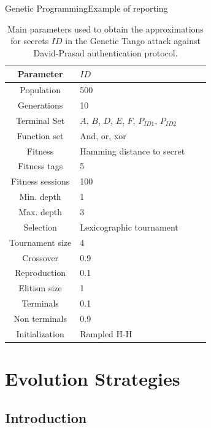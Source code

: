 \documentclass[10pt,compress]{beamer} %
\begin{document}
\begin{frame}[plain]{Genetic Programming}{Example of reporting} 
\scriptsize{
\begin{table}
	\centering
	\caption{Main parameters used to obtain the approximations for secrets $ID$ in the Genetic Tango attack against David-Prasad authentication protocol.  \label{tab:settings}}
	\begin{tabular}{clll} \hline 
	Parameter		& $ID$			\\ \hline
	Population		& 500			\\
	Generations		& 10			\\
	Terminal Set	& $A$, $B$, $D$, $E$, $F$, $P_{ID1}$, $P_{ID2}$	\\
	Function set	& And, or, xor	\\
	Fitness			& Hamming distance to secret\\
	Fitness tags	& 5				\\
	Fitness sessions& 100			\\
	Min. depth		& 1				\\
	Max. depth		& 3 			\\
	Selection		& Lexicographic tournament\\
	Tournament size	& 4				\\
	Crossover		& 0.9			\\
	Reproduction	& 0.1			\\
	Elitism size	& 1 			\\
	Terminals		& 0.1			\\
	Non terminals	& 0.9			\\
	Initialization  & Rampled H-H	\\
	\hline\end{tabular}
\end{table}
}
\end{frame}

\section{Evolution Strategies}
\subsection{Introduction}
\end{document}
